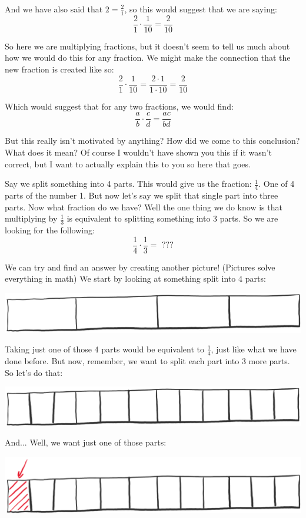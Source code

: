 \documentclass{article}
\begin{document}
And we have also said that $2 = \frac{2}{1}$, so this would suggest that we are saying: 
\[ \frac{2}{1} \cdot \frac{1}{10} = \frac{2}{10} \]

So here we are multiplying fractions, but it doesn't seem to tell us much about how we would do this for any fraction. We might make the connection that the new fraction is created like so: 
\[ \frac{2}{1} \cdot \frac{1}{10} = \frac{2 \cdot 1}{1 \cdot 10} = \frac{2}{10} \]

Which would suggest that for any two fractions, we would find: 
\[ \frac{a}{b} \cdot \frac{c}{d} = \frac{ac}{bd} \]

But this really isn't motivated by anything? How did we come to this conclusion? What does it mean? Of course I wouldn't have shown you this if it wasn't correct, but I want to actually explain this to you so here that goes. 

Say we split something into 4 parts. This would give us the fraction: $\frac{1}{4}$. One of 4 parts of the number 1. But now let's say we split that single part into three parts. Now what fraction do we have? 
Well the one thing we do know is that multiplying by $\frac{1}{3}$ is equivalent to splitting something into 3 parts. So we are looking for the following: 
\[ \frac{1}{4} \cdot \frac{1}{3} = \text{ ???} \] 

We can try and find an answer by creating another picture! (Pictures solve everything in math) We start by looking at something split into 4 parts: 
\begin{center}
    \includegraphics[scale=0.7]{chapter5_draw6.png}
\end{center}

Taking just one of those 4 parts would be equivalent to $\frac{1}{4}$, just like what we have done before. But now, remember, we want to split each part into 3 more parts. So let's do that: 
\begin{center}
    \includegraphics[scale=0.7]{chapter5_draw7.png}
\end{center}

And... Well, we want just one of those parts: 
\begin{center}
    \includegraphics[scale=0.7]{chapter5_draw8.png}
\end{center}
\end{document}
